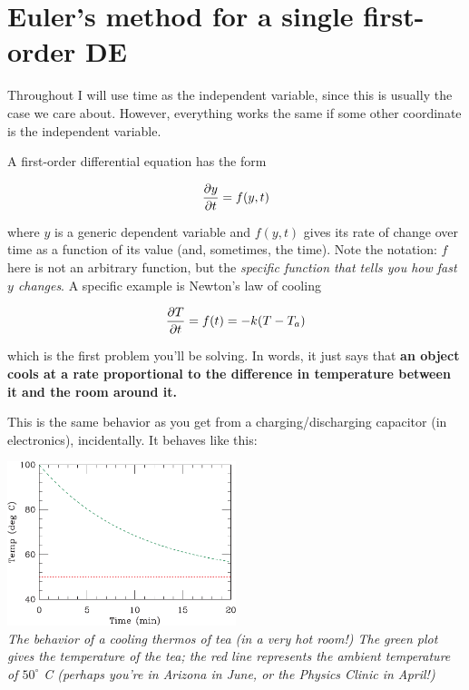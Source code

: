 \documentclass[12ampt]{article}
\def\PAR#1#2{ {{\partial #1}\over{\partial #2}} }
\newcommand{\BC}{\begin{center}}
\newcommand{\EC}{\end{center}}
\begin{document}
\section{Euler's method for a single first-order DE}

Throughout I will use time as the independent variable, since this is usually the case we care about. However, everything works the same if some other 
coordinate is the independent variable.

A first-order differential equation has the form

\begin{equation}
  \PAR{y}{t} = f(y,t)
\end{equation}

where $y$ is a generic dependent variable and 
$f(y,t)$ gives its rate of change over time as a function of its value (and, sometimes, the time). Note the notation: $f$ here is not an arbitrary function, but 
the {\it specific function that tells you how fast $y$ changes}.
A specific example is 
Newton's law of cooling

\begin{equation}
  \PAR{T}{t} = f(t) = -k(T-T_a)
\end{equation}

which is the first problem you'll be solving. In words, it just says that 
{\bf an object cools at a rate proportional to the difference in temperature between
it and the room around it.}

This is the same behavior as you get from a charging/discharging capacitor (in 
electronics), incidentally. It behaves like this:

\BC
\includegraphics[width=0.5\textwidth]{cooling-intro-crop.pdf} \\
\scriptsize \it The behavior of a cooling thermos of tea (in a very hot room!) 
The green plot gives the temperature of the tea; the red line represents the 
ambient temperature of $50^\circ$ C (perhaps you're in Arizona in June, or the 
Physics Clinic in April!)
\EC
\end{document}
